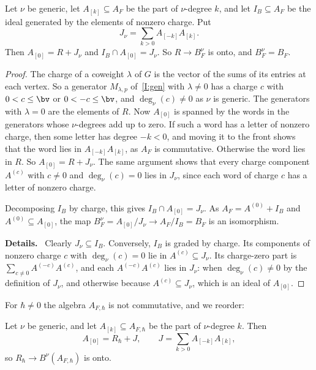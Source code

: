 \documentclass[11pt]{amsart}
\newenvironment{details}{\par\color{black!60!green}\noindent\textbf{Details.}\ }{\par}
\begin{document}
\begin{lemma}\label{lem:generic}
Let $\nu$ be generic, let $A_{[k]}\subseteq A_F$ be the part of
$\nu$-degree $k$, and let $I_B\subseteq A_F$ be the ideal generated by the
elements of nonzero charge.  Put
\[
 J_\nu=\sum_{k>0}A_{[-k]}A_{[k]}.
\]
Then $A_{[0]}=R+J_\nu$ and $I_B\cap A_{[0]}=J_\nu$.  So $R\to
B^\nu_F$ is onto, and $B^\nu_F=B_F$.
\end{lemma}

\begin{proof}
The charge of a coweight $\lambda$ of $G$ is the vector of the sums of its
entries at each vertex.  So a generator $M_{\lambda,p}$ of~\ref{I:gen} with
$\lambda\neq0$ has a charge $c$ with $0<c\le\bv$ or $0<-c\le\bv$, and
$\deg_\nu(c)\neq0$ as $\nu$ is generic.  The generators with $\lambda=0$ are
the elements of $R$.  Now $A_{[0]}$ is spanned by the words in the generators
whose $\nu$-degrees add up to zero.  If such a word has a letter of nonzero
charge, then some letter has degree $-k<0$, and moving it to the front shows
that the word lies in $A_{[-k]}A_{[k]}$, as $A_F$ is commutative.  Otherwise
the word lies in $R$.  So $A_{[0]}=R+J_\nu$.  The same argument shows that
every charge component $A^{(c)}$ with $c\neq0$ and $\deg_\nu(c)=0$ lies in
$J_\nu$, since each word of charge $c$ has a letter of nonzero charge.

Decomposing $I_B$ by charge, this gives $I_B\cap A_{[0]}=J_\nu$.  As
$A_F=A^{(0)}+I_B$ and $A^{(0)}\subseteq A_{[0]}$, the map
$B^\nu_F=A_{[0]}/J_\nu\to A_F/I_B=B_F$ is an isomorphism.
\begin{details}
Clearly $J_\nu\subseteq I_B$.  Conversely, $I_B$ is graded by charge.  Its
components of nonzero charge $c$ with $\deg_\nu(c)=0$ lie in $A^{(c)}\subseteq
J_\nu$.  Its charge-zero part is $\sum_{c\neq0}A^{(-c)}A^{(c)}$, and each
$A^{(-c)}A^{(c)}$ lies in $J_\nu$: when $\deg_\nu(c)\neq0$ by the definition
of $J_\nu$, and otherwise because $A^{(c)}\subseteq J_\nu$, which is an ideal of
$A_{[0]}$.
\end{details}
\end{proof}

For $\hbar\neq0$ the algebra $A_{F,\hbar}$ is not commutative, and we reorder:

\begin{lemma}\label{lem:qsurj}
Let $\nu$ be generic, and let $A_{[k]}\subseteq A_{F,\hbar}$ be the part of
$\nu$-degree $k$.  Then
\[
 A_{[0]}=R_\hbar+J,\qquad J=\sum_{k>0}A_{[-k]}A_{[k]},
\]
so $R_\hbar\to B^\nu(A_{F,\hbar})$ is onto.
\end{lemma}
\end{document}
